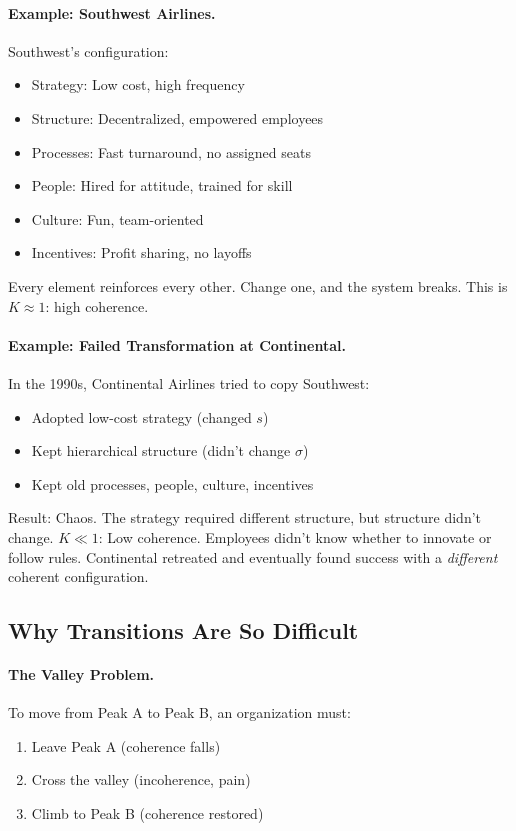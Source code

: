 \documentclass[12pt,a4paper]{article}
\begin{document}
\paragraph{Example: Southwest Airlines.}
Southwest's configuration:
\begin{itemize}
  \item Strategy: Low cost, high frequency
  \item Structure: Decentralized, empowered employees
  \item Processes: Fast turnaround, no assigned seats
  \item People: Hired for attitude, trained for skill
  \item Culture: Fun, team-oriented
  \item Incentives: Profit sharing, no layoffs
\end{itemize}

Every element reinforces every other. Change one, and the system breaks.
This is $K \approx 1$: high coherence.

\paragraph{Example: Failed Transformation at Continental.}
In the 1990s, Continental Airlines tried to copy Southwest:
\begin{itemize}
  \item Adopted low-cost strategy (changed $s$)
  \item Kept hierarchical structure (didn't change $\sigma$)
  \item Kept old processes, people, culture, incentives
\end{itemize}

Result: Chaos. The strategy required different structure, but structure didn't change.
$K \ll 1$: Low coherence. Employees didn't know whether to innovate or follow rules.
Continental retreated and eventually found success with a \emph{different} coherent configuration.

\subsection{Why Transitions Are So Difficult}

\paragraph{The Valley Problem.}
To move from Peak A to Peak B, an organization must:
\begin{enumerate}
  \item Leave Peak A (coherence falls)
  \item Cross the valley (incoherence, pain)
  \item Climb to Peak B (coherence restored)
\end{enumerate}
\end{document}

